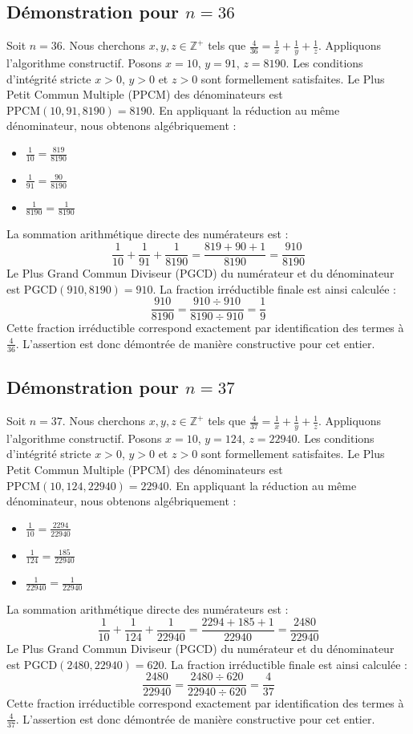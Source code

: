 \documentclass[11pt,a4paper]{article}
\begin{document}
\subsection{Démonstration pour $n = 36$}
Soit $n = 36$. Nous cherchons $x, y, z \in \mathbb{Z}^{+}$ tels que $\frac{4}{36} = \frac{1}{x} + \frac{1}{y} + \frac{1}{z}$.
Appliquons l'algorithme constructif. Posons $x = 10$, $y = 91$, $z = 8190$.
Les conditions d'intégrité stricte $x > 0$, $y > 0$ et $z > 0$ sont formellement satisfaites.
Le Plus Petit Commun Multiple (PPCM) des dénominateurs est $\text{PPCM}(10, 91, 8190) = 8190$.
En appliquant la réduction au même dénominateur, nous obtenons algébriquement :
\begin{itemize}
    \item $\frac{1}{10} = \frac{819}{8190}$
    \item $\frac{1}{91} = \frac{90}{8190}$
    \item $\frac{1}{8190} = \frac{1}{8190}$
\end{itemize}
La sommation arithmétique directe des numérateurs est :
$$ \frac{1}{10} + \frac{1}{91} + \frac{1}{8190} = \frac{819 + 90 + 1}{8190} = \frac{910}{8190} $$
Le Plus Grand Commun Diviseur (PGCD) du numérateur et du dénominateur est $\text{PGCD}(910, 8190) = 910$.
La fraction irréductible finale est ainsi calculée :
$$ \frac{910}{8190} = \frac{910 \div 910}{8190 \div 910} = \frac{1}{9} $$
Cette fraction irréductible correspond exactement par identification des termes à $\frac{4}{36}$. L'assertion est donc démontrée de manière constructive pour cet entier.

\subsection{Démonstration pour $n = 37$}
Soit $n = 37$. Nous cherchons $x, y, z \in \mathbb{Z}^{+}$ tels que $\frac{4}{37} = \frac{1}{x} + \frac{1}{y} + \frac{1}{z}$.
Appliquons l'algorithme constructif. Posons $x = 10$, $y = 124$, $z = 22940$.
Les conditions d'intégrité stricte $x > 0$, $y > 0$ et $z > 0$ sont formellement satisfaites.
Le Plus Petit Commun Multiple (PPCM) des dénominateurs est $\text{PPCM}(10, 124, 22940) = 22940$.
En appliquant la réduction au même dénominateur, nous obtenons algébriquement :
\begin{itemize}
    \item $\frac{1}{10} = \frac{2294}{22940}$
    \item $\frac{1}{124} = \frac{185}{22940}$
    \item $\frac{1}{22940} = \frac{1}{22940}$
\end{itemize}
La sommation arithmétique directe des numérateurs est :
$$ \frac{1}{10} + \frac{1}{124} + \frac{1}{22940} = \frac{2294 + 185 + 1}{22940} = \frac{2480}{22940} $$
Le Plus Grand Commun Diviseur (PGCD) du numérateur et du dénominateur est $\text{PGCD}(2480, 22940) = 620$.
La fraction irréductible finale est ainsi calculée :
$$ \frac{2480}{22940} = \frac{2480 \div 620}{22940 \div 620} = \frac{4}{37} $$
Cette fraction irréductible correspond exactement par identification des termes à $\frac{4}{37}$. L'assertion est donc démontrée de manière constructive pour cet entier.
\end{document}
